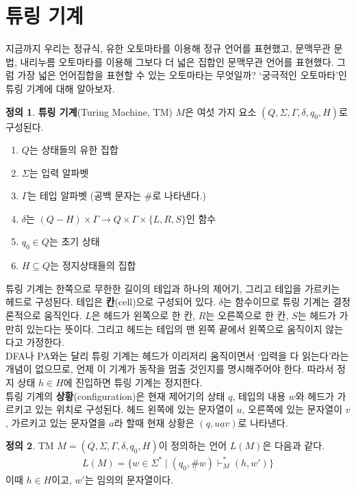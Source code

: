 \documentclass[b5paper, 11pt]{book}
\theoremstyle{definition}
\newtheorem{defn}{정의}[chapter]
\begin{document}
\section{튜링 기계} \label{turing machine}
지금까지 우리는 정규식, 유한 오토마타를 이용해 정규 언어를 표현했고, 문맥무관 문법, 내리누름 오토마타를 이용해 그보다 더 넓은 집합인 문맥무관 언어를 표현했다. 그럼 가장 넓은 언어집합을 표현할 수 있는 오토마타는 무엇일까? `궁극적인 오토마타'인 튜링 기계에 대해 알아보자. 
\begin{defn}
    \textbf{튜링 기계}(Turing Machine, TM) $M$은 여섯 가지 요소 $(Q, \Sigma, \Gamma, \delta, q_0, H)$로 구성된다. 
    \begin{enumerate}
        \item $Q$는 상태들의 유한 집합
        \item $\Sigma$는 입력 알파벳
        \item $\Gamma$는 테입 알파벳 (공백 문자는 \#로 나타낸다.)
        \item $\delta$는 $(Q - H) \times \Gamma \rightarrow Q \times 
        \Gamma \times \{L, R, S\}$인 함수
        \item $q_0 \in Q$는 초기 상태
        \item $H \subseteq Q$는 정지상태들의 집합
    \end{enumerate}
\end{defn}
튜링 기계는 한쪽으로 무한한 길이의 테입과 하나의 제어기, 그리고 테입을 가르키는 헤드로 구성된다. 테입은 \textbf{칸}(cell)으로 구성되어 있다. $\delta$는 함수이므로 튜링 기계는 결정론적으로 움직인다. $L$은 헤드가 왼쪽으로 한 칸, $R$는 오른쪽으로 한 칸, $S$는 헤드가 가만히 있는다는 뜻이다. 그리고 헤드는 테입의 맨 왼쪽 끝에서 왼쪽으로 움직이지 않는다고 가정한다.\\ 
DFA나 PA와는 달리 튜링 기계는 헤드가 이리저리 움직이면서 `입력을 다 읽는다'라는 개념이 없으므로, 언제 이 기계가 동작을 멈출 것인지를 명시해주어야 한다. 따라서 정지 상태 $h \in H$에 진입하면 튜링 기계는 정지한다.  \\ 
튜링 기계의 \textbf{상황}(configuration)은 현재 제어기의 상태 $q$, 테입의 내용 $w$와 헤드가 가르키고 있는 위치로 구성된다. 헤드 왼쪽에 있는 문자열이 $u$, 오른쪽에 있는 문자열이 $v$, 가르키고 있는 문자열을 $a$라 할때 현재 상황은 $(q, u\underline{a}v)$로 나타낸다.  
\begin{defn}
    TM $M = (Q, \Sigma, \Gamma, \delta, q_0, H)$이 정의하는 언어 $L(M)$은 다음과 같다.
    \begin{align*}
        L(M) = \{ w \in \Sigma^*  \;\vert\;  (q_0, \underline{\#}w) \vdash_M^* (h, w') \} 
    \end{align*}
    이때 $h\in H$이고, $w'$는 임의의 문자열이다.  
\end{defn}
\end{document}
